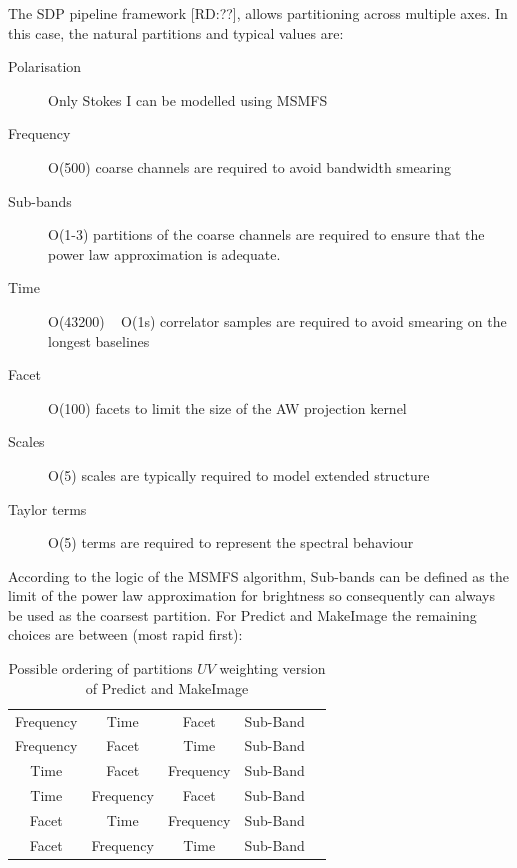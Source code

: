 \documentclass[11pt,a4paper]{article}
\begin{document}
The SDP pipeline framework [RD:??], allows partitioning across multiple axes. In this case, the natural partitions and typical values are:

\begin{description}
\item[Polarisation] Only Stokes I can be modelled using MSMFS
\item[Frequency] O(500) coarse channels are required to avoid bandwidth smearing
\item[Sub-bands] O(1-3) partitions of the coarse channels are required to ensure that the power law approximation is adequate.
\item[Time] O(43200) ~ O(1s) correlator samples are required to avoid smearing on the longest baselines
\item[Facet] O(100) facets to limit the size of the AW projection kernel
\item[Scales] O(5) scales are typically required to model extended structure
\item[Taylor terms] O(5) terms are required to represent the spectral behaviour
\end{description}

According to the logic of the MSMFS algorithm, Sub-bands can be defined as the limit of the power law approximation for brightness so consequently can always be used as the coarsest partition. For Predict and MakeImage the remaining choices are between (most rapid first):

\begin{table}[htp]
 \caption{Possible ordering of partitions $UV$ weighting version of Predict and MakeImage}
 \begin{center}
 \begin{tabular}{|c|c|c|c|c|}
\hline
Frequency & Time & Facet & Sub-Band \\
Frequency & Facet & Time & Sub-Band \\
Time & Facet & Frequency & Sub-Band \\
Time & Frequency & Facet & Sub-Band \\
Facet & Time & Frequency & Sub-Band \\
Facet & Frequency & Time & Sub-Band \\
\hline
\end{tabular}
\end{center}
\end{table}
\end{document}
